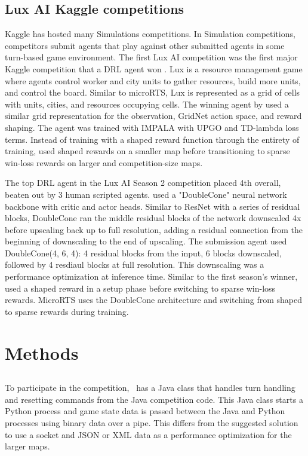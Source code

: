 \documentclass{article}
\begin{document}
\subsection{Lux AI Kaggle competitions}
Kaggle has hosted many Simulations competitions. In Simulation competitions, competitors
submit agents that play against other submitted agents in some turn-based game
environment. The first Lux AI competition was the first major Kaggle competition that a
DRL agent won \citep{lux-ai-2021}. Lux is a resource management game where agents
control worker and city units to gather resources, build more units, and control the
board. Similar to microRTS, Lux is represented as a grid of cells with units, cities,
and resources occupying cells. The winning agent by \citet{lux-ai-2021-winner} used a
similar grid representation for the observation, GridNet action space, and reward
shaping. The agent was trained with IMPALA with UPGO and TD-lambda loss terms. Instead
of training with a shaped reward function through the entirety of training, \citet{lux-ai-2021-winner}
used shaped rewards on a smaller map before transitioning to sparse win-loss rewards on
larger and competition-size maps.

The top DRL agent in the Lux AI Season 2 competition placed 4th overall, beaten out by 3
human scripted agents. \citet{Ferdinand2021doublecone} used a "DoubleCone" neural
network backbone with critic and actor heads. Similar to ResNet with a series of
residual blocks, DoubleCone ran the middle residual blocks of the network downscaled 4x
before upscaling back up to full resolution, adding a residual connection from the
beginning of downscaling to the end of upscaling. The submission agent used
DoubleCone(4, 6, 4): 4 residual blocks from the input, 6 blocks downscaled, followed by
4 resdiaul blocks at full resolution. This downscaling was a performance optimization at
inference time. Similar to the first season's winner, \citet{Ferdinand2021doublecone}
used a shaped reward in a setup phase before switching to sparse win-loss rewards. MicroRTS uses the DoubleCone architecture and switching from shaped to sparse rewards
during training.

\section{Methods}
\subsection{\agentName}
To participate in the competition, \agentName\ has a Java class that handles turn
handling and resetting commands from the Java competition code. This Java class starts a
Python process and game state data is passed between the Java and Python processes using
binary data over a pipe. This differs from the suggested solution to use a socket and
JSON or XML data as a performance optimization for the larger maps.
\end{document}
